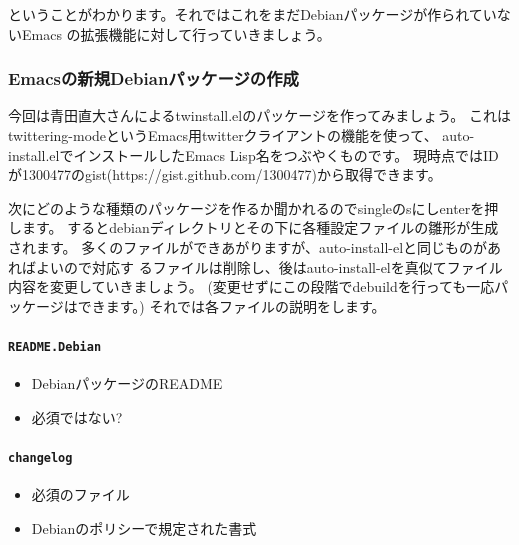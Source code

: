 \documentclass[mingoth,a4paper]{jsarticle}
\begin{document}
ということがわかります。それではこれをまだDebianパッケージが作られていないEmacs
の拡張機能に対して行っていきましょう。

\subsubsection{Emacsの新規Debianパッケージの作成}

今回は青田直大さんによるtwinstall.elのパッケージを作ってみましょう。
これはtwittering-modeというEmacs用twitterクライアントの機能を使って、
auto-install.elでインストールしたEmacs Lisp名をつぶやくものです。
現時点ではIDが1300477のgist(https://gist.github.com/1300477)から取得できます。


次にどのような種類のパッケージを作るか聞かれるのでsingleのsにしenterを押します。
するとdebianディレクトリとその下に各種設定ファイルの雛形が生成されます。
多くのファイルができあがりますが、auto-install-elと同じものがあればよいので対応す
るファイルは削除し、後はauto-install-elを真似てファイル内容を変更していきましょう。
(変更せずにこの段階でdebuildを行っても一応パッケージはできます。)
それでは各ファイルの説明をします。

\clearpage

\paragraph{\texttt{README.Debian}}
  \begin{itemize}
    \item DebianパッケージのREADME
    \item 必須ではない?
  \end{itemize}

\paragraph{\texttt{changelog}}
  \begin{itemize}
    \item 必須のファイル
    \item Debianのポリシーで規定された書式
  \end{itemize}
\end{document}
